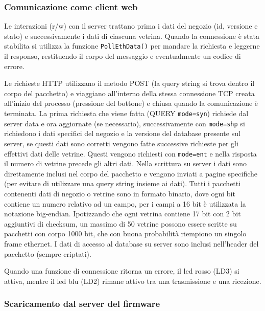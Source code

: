 \subsubsection{Comunicazione come client web}


Le interazioni (r/w) con il server trattano prima i dati del negozio (id, versione e stato) e successivamente i dati di ciascuna vetrina. Quando la connessione \`e stata stabilita si utilizza la funzione \texttt{PollEthData()} per mandare la richiesta e leggerne il responso, restituendo il corpo del messaggio e eventualmente un codice di errore. 

Le richieste HTTP utilizzano il metodo POST (la query string si trova dentro il corpo del pacchetto) e viaggiano all'interno della stessa connessione TCP creata all'inizio del processo (pressione del bottone) e chiusa quando la comunicazione \`e terminata. La prima richiesta che viene fatta (QUERY \texttt{mode=syn}) richiede dal server data e ora aggiornate (se necessario), successivamente con \texttt{mode=shp} si richiedono i dati specifici del negozio e la versione del database presente sul server, se questi dati sono corretti vengono fatte successive richieste per gli effettivi dati delle vetrine. Questi vengono richiesti con \texttt{mode=ent} e nella risposta il numero di vetrine precede gli altri dati. Nella scrittura su server i dati sono direttamente inclusi nel corpo del pacchetto e vengono inviati a pagine specifiche (per evitare di utilizzare una query string insieme ai dati). Tutti i pacchetti contenenti dati di negozio o vetrine sono in formato binario, dove ogni bit contiene un numero relativo ad un campo, per i campi a 16 bit \`e utilizzata la notazione big-endian.
Ipotizzando che ogni vetrina contiene 17 bit con 2 bit aggiuntivi di checksum, un massimo di 50 vetrine possono essere scritte su pacchetti con corpo 1000 bit, che con buona probabilit\`a riempiono un singolo frame ethernet. I dati di accesso al database su server sono inclusi nell'header del pacchetto (sempre criptati).

Quando una funzione di connessione ritorna un errore, il led rosso (LD3) si attiva, mentre il led blu (LD2) rimane attivo tra una trasmissione e una ricezione.

\subsubsection{Scaricamento dal server del firmware}

